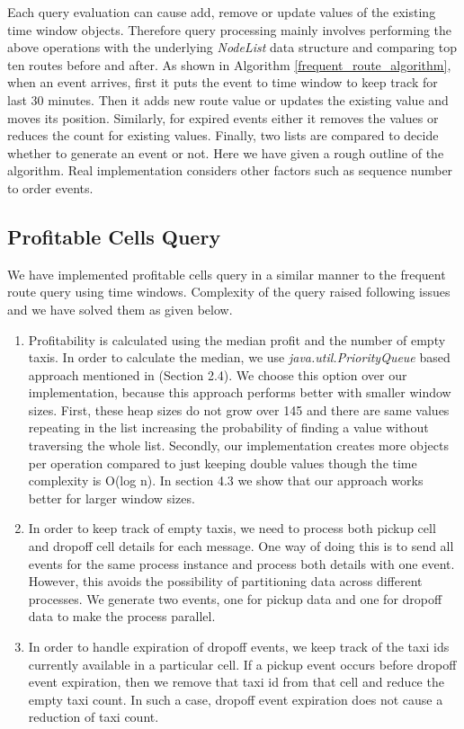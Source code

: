 Each query evaluation can cause add, remove or update values of the existing time window objects. Therefore query processing mainly involves performing the above operations with the underlying \textit{NodeList} data structure and comparing top ten routes before and after. As shown in Algorithm \ref{frequent_route_algorithm}, when an event arrives, first it puts the event to time window to keep track for last 30 minutes. Then it adds new route value or updates the existing value and moves its position. Similarly, for expired events either it removes the values or reduces the count for existing values. Finally, two lists are compared to decide whether to generate an event or not. Here we have given a rough outline of the algorithm. Real implementation considers other factors such as sequence number to order events.

\subsection{Profitable Cells Query}

We have implemented profitable cells query in a similar manner to the frequent route query using  time windows. Complexity of the query raised following issues and we have solved them as given below.
\begin{enumerate}
	\item Profitability is calculated using the median profit and the number of empty taxis. In order to calculate the median, we use \textit{java.util.PriorityQueue} based approach mentioned in (Section 2.4). We choose this option over our implementation, because this approach performs better with smaller window sizes. First, these heap sizes do not grow over 145 and there are same values repeating in the list increasing the probability of finding a value without traversing the whole list. Secondly, our implementation creates more objects per operation compared to just keeping double values though the time complexity is O(log n). In section 4.3 we show that our approach works better for larger window sizes.
	\item In order to keep track of empty taxis, we need to process both pickup cell and dropoff cell details for each message. One way of doing this is to send all events for the same process instance and process both details with one event. However, this avoids the possibility of partitioning data across different processes. We generate two events, one for pickup data and one for dropoff data to make the process parallel. 
	\item In order to handle expiration of dropoff events, we keep track of the taxi ids currently available in a particular cell. If a pickup event occurs before dropoff event expiration, then we remove that taxi id from that cell and reduce the empty taxi count. In such a case, dropoff event expiration does not cause a reduction of taxi count.
\end{enumerate}

